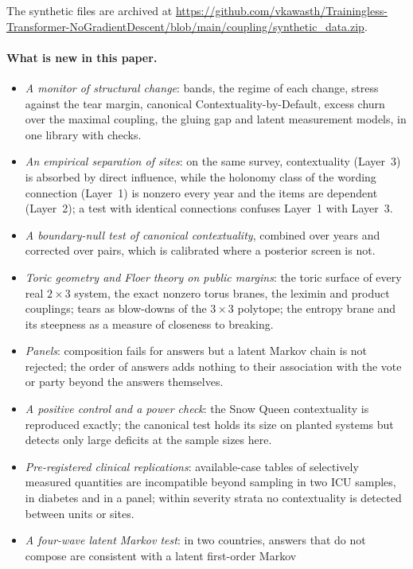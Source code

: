 \documentclass[11pt]{article}
\theoremstyle{definition}
\theoremstyle{remark}
\begin{document}
The synthetic files are archived at
\url{https://github.com/vkawasth/Trainingless-Transformer-NoGradientDescent/blob/main/coupling/synthetic_data.zip}.

\paragraph{What is new in this paper.}
\begin{itemize}[leftmargin=*,nosep]
\item \emph{A monitor of structural change}: bands, the regime of each change, stress against the tear margin, canonical
  Contextuality-by-Default, excess churn over the maximal coupling, the gluing gap and latent measurement models, in one library with
  checks.
\item \emph{An empirical separation of sites}: on the same survey, contextuality (Layer~3) is absorbed by direct influence, while the
  holonomy class of the wording connection (Layer~1) is nonzero every year and the items are dependent (Layer~2); a test with identical
  connections confuses Layer~1 with Layer~3.
\item \emph{A boundary-null test of canonical contextuality}, combined over years and corrected over pairs, which is calibrated where a
  posterior screen is not.
\item \emph{Toric geometry and Floer theory on public margins}: the toric surface of every real $2\times3$ system, the exact nonzero
  torus branes, the leximin and product couplings; tears as blow-downs of the $3\times3$ polytope; the entropy brane and its
  steepness as a measure of closeness to breaking.
\item \emph{Panels}: composition fails for answers but a latent Markov chain is not rejected; the order of answers adds nothing to their association
  with the vote or party beyond the answers themselves.
\item \emph{A positive control and a power check}: the Snow Queen contextuality is reproduced exactly; the canonical test holds its size
  on planted systems but detects only large deficits at the sample sizes here.
\item \emph{Pre-registered clinical replications}: available-case tables of selectively measured quantities are incompatible beyond
  sampling in two ICU samples, in diabetes and in a panel; within severity strata no contextuality is detected between units or sites.
\item \emph{A four-wave latent Markov test}: in two countries, answers that do not compose are consistent with a latent first-order Markov

\end{itemize}
\end{document}
